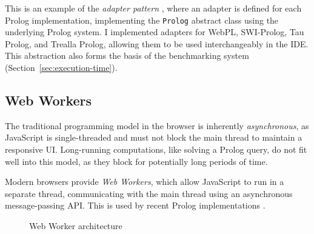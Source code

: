 This is an example of the \emph{adapter pattern} \cite{gammaDesignPatternsElements1995}, where an adapter is defined for each Prolog implementation, implementing the \texttt{Prolog} abstract class using the underlying Prolog system. I implemented adapters for WebPL, SWI-Prolog, Tau Prolog, and Trealla Prolog, allowing them to be used interchangeably in the IDE. This abstraction also forms the basis of the benchmarking system (Section~\ref{sec:execution-time}).

\subsection{Web Workers}

The traditional programming model in the browser is inherently \emph{asynchronous}, as JavaScript is single-threaded and must not block the main thread to maintain a responsive UI. Long-running computations, like solving a Prolog query, do not fit well into this model, as they block for potentially long periods of time.

Modern browsers provide \emph{Web Workers}, which allow JavaScript to run in a separate thread, communicating with the main thread using an asynchronous message-passing API. This is used by recent Prolog implementations \cite{garcia-pradalessCASPInBrowserPlayground2022, riazaTauPrologProlog2024}.

\begin{figure}[H]
\centering
{}
\caption{Web Worker architecture}
\label{fig:web-worker-arch}
\end{figure}

